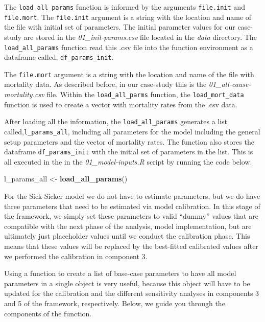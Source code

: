 \documentclass[]{book}
\newenvironment{Shaded}{\begin{snugshade}}{\end{snugshade}}
\newcommand{\KeywordTok}[1]{\textcolor[rgb]{0.13,0.29,0.53}{\textbf{#1}}}
\newcommand{\NormalTok}[1]{#1}
\newcommand{\StringTok}[1]{\textcolor[rgb]{0.31,0.60,0.02}{#1}}
\begin{document}
The \texttt{load\_all\_params} function is informed by the arguments \texttt{file.init} and \texttt{file.mort}. The \texttt{file.init} argument is a string with the location and name of the file with initial set of parameters. The initial parameter values for our case-study are stored in the \emph{01\_init-params.csv} file located in the \emph{data} directory. The \texttt{load\_all\_params} function read this .csv file into the function environment as a dataframe called, \texttt{df\_params\_init}.

The \texttt{file.mort} argument is a string with the location and name of the file with mortality data. As described before, in our case-study this is the \emph{01\_all-cause-mortality.csv} file. Within the \texttt{load\_all\_parms} function, the \texttt{load\_mort\_data} function is used to create a vector with mortality rates from the .csv data.

After loading all the information, the \texttt{load\_all\_params} generates a list called,\texttt{l\_params\_all}, including all parameters for the model including the general setup parameters and the vector of mortality rates. The function also stores the dataframe \texttt{df\_params\_init} with the initial set of parameters in the list. This is all executed in the in the \emph{01\_model-inputs.R} script by running the code below.

\begin{Shaded}
\begin{Highlighting}[]
\NormalTok{l_params_all <-}\StringTok{ }\KeywordTok{load_all_params}\NormalTok{()}
\end{Highlighting}
\end{Shaded}

For the Sick-Sicker model we do not have to estimate parameters, but we do have three parameters that need to be estimated via model calibration. In this stage of the framework, we simply set these parameters to valid ``dummy'' values that are compatible with the next phase of the analysis, model implementation, but are ultimately just placeholder values until we conduct the calibration phase. This means that these values will be replaced by the best-fitted calibrated values after we performed the calibration in component 3.

Using a function to create a list of base-case parameters to have all model parameters in a single object is very useful, because this object will have to be updated for the calibration and the different sensitivity analyses in components 3 and 5 of the framework, respectively. Below, we guide you through the components of the function.
\end{document}
